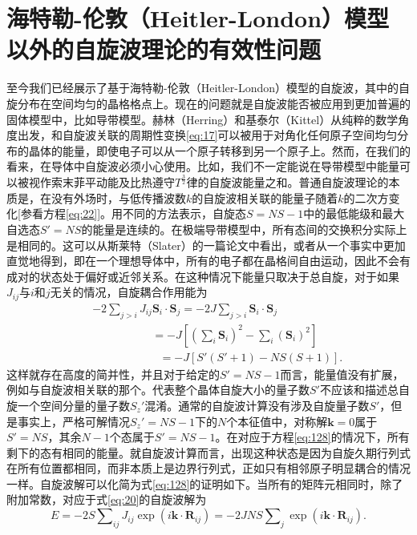 \documentclass{article}
\begin{document}

\section{海特勒-伦敦（Heitler-London）模型以外的自旋波理论的有效性问题} \label{sec:11}

至今我们已经展示了基于海特勒-伦敦（Heitler-London）模型的自旋波，其中的自旋分布在空间均匀的晶格格点上。现在的问题就是自旋波能否被应用到更加普遍的固体模型中，比如导带模型。赫林（Herring）和基泰尔（Kittel）从纯粹的数学角度出发，和自旋波关联的周期性变换\eqref{eq:17}可以被用于对角化任何原子空间均匀分布的晶体的能量，即使电子可以从一个原子转移到另一个原子上。然而，在我们的看来，在导体中自旋波必须小心使用。比如，我们不一定能说在导带模型中能量可以被视作索末菲平动能及比热遵守$T^\frac{3}{2}$律的自旋波能量之和。普通自旋波理论的本质是，在没有外场时，与低传播波数$k$的自旋波相关联的能量子随着$k$的二次方变化[参看方程\eqref{eq:22}]。用不同的方法表示，自旋态$S=NS-1$中的最低能级和最大自选态$S'=NS$的能量是连续的。在极端导带模型中，所有态间的交换积分实际上是相同的。这可以从斯莱特（Slater）的一篇论文中看出，或者从一个事实中更加直觉地得到，即在一个理想导体中，所有的电子都在晶格间自由运动，因此不会有成对的状态处于偏好或近邻关系。在这种情况下能量只取决于总自旋，对于如果$J_{ij}$与$i$和$j$无关的情况，自旋耦合作用能为
\begin{eqnarray} \label{eq:128}
&&-2\sum\nolimits_{j>i}J_{ij}\mathbf{S}_i\cdot\mathbf{S}_j=-2J\sum\nolimits_{j>i}\mathbf{S}_i\cdot\mathbf{S}_j\nonumber\\
&&~~~~~~~~~~~~~~~~~~~~~~~~=-J[(\sum\nolimits_i\mathbf{S}_i)^2-\sum\nolimits_i(\mathbf{S}_i)^2]\nonumber\\
&&~~~~~~~~~~~~~~~~~~~~~~~~~~~=-J[S'(S'+1)-NS(S+1)].
\end{eqnarray}
这样就存在高度的简并性，并且对于给定的$S'=NS-1$而言，能量值没有扩展，例如与自旋波相关联的那个。代表整个晶体自旋大小的量子数$S'$不应该和描述总自旋一个空间分量的量子数$S_z'$混淆。通常的自旋波计算没有涉及自旋量子数$S'$，但是事实上，严格可解情况$S_z'=NS-1$下的$N$个本征值中，对称解$\mathbf{k}=0$属于$S'=NS$，其余$N-1$个态属于$S'=NS-1$。在对应于方程\eqref{eq:128}的情况下，所有剩下的态有相同的能量。就自旋波计算而言，出现这种状态是因为自旋久期行列式在所有位置都相同，而非本质上是边界行列式，正如只有相邻原子明显耦合的情况一样。自旋波解可以化简为式\eqref{eq:128}的证明如下。当所有的矩阵元相同时，除了附加常数，对应于式\eqref{eq:20}的自旋波解为
\begin{equation*} 
E=-2S\sum\nolimits_\mathit{ij}J_\mathit{ij}\exp(i\mathbf{k}\cdot\mathbf{R}_\mathit{ij})=-2JNS\sum\nolimits_j\exp(i\mathbf{k}\cdot\mathbf{R}_\mathit{ij}).
\end{equation*}
\end{document}
